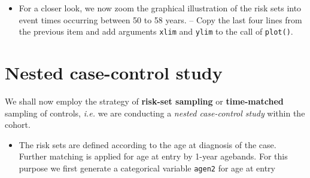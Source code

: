 \documentclass[
]{book}
\newenvironment{Shaded}{\begin{snugshade}}{\end{snugshade}}
\newcommand{\AttributeTok}[1]{\textcolor[rgb]{0.13,0.29,0.53}{#1}}
\newcommand{\ConstantTok}[1]{\textcolor[rgb]{0.56,0.35,0.01}{#1}}
\newcommand{\DecValTok}[1]{\textcolor[rgb]{0.00,0.00,0.81}{#1}}
\newcommand{\FunctionTok}[1]{\textcolor[rgb]{0.13,0.29,0.53}{\textbf{#1}}}
\newcommand{\NormalTok}[1]{#1}
\newcommand{\OtherTok}[1]{\textcolor[rgb]{0.56,0.35,0.01}{#1}}
\newcommand{\SpecialCharTok}[1]{\textcolor[rgb]{0.81,0.36,0.00}{\textbf{#1}}}
\newcommand{\StringTok}[1]{\textcolor[rgb]{0.31,0.60,0.02}{#1}}
\providecommand{\tightlist}{%
  \setlength{\itemsep}{0pt}\setlength{\parskip}{0pt}}
\begin{document}
\begin{itemize}
\tightlist
\item
  For a closer look, we now
  zoom the graphical illustration of the risk sets into
  event times occurring between 50 to 58 years. --
  Copy the last four lines from the previous item and add arguments \texttt{xlim} and \texttt{ylim}
  to the call of \texttt{plot()}.
\end{itemize}

\begin{Shaded}
\end{Shaded}

\section{Nested case-control study}\label{nested-case-control-study}

We shall now employ the strategy of \textbf{risk-set sampling}
or \textbf{time-matched} sampling of controls, \emph{i.e.}
we are conducting a \emph{nested case-control study}
within the cohort.

\begin{itemize}
\tightlist
\item
  The risk sets are defined according to the age at diagnosis of the case. Further matching is applied for age at entry by 1-year agebands.
  For this purpose we first generate a categorical variable
  \texttt{agen2} for age at entry
\end{itemize}

\begin{Shaded}
\end{Shaded}
\end{document}
